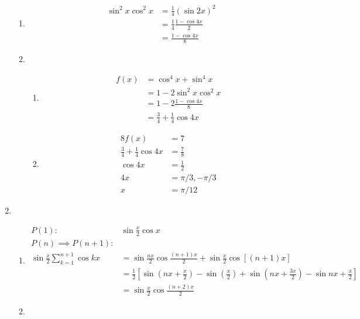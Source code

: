 \documentclass[12pt]{article}
\begin{document}
\begin{enumerate}
\begin{enumerate}
            \item \begin{align*}
                \sin^2{x}\cos^2{x}&=\frac{1}{4}(\sin{2x})^2\\
                &=\frac{1}{4}\frac{1-\cos{4x}}{2}\\
                &=\frac{1-\cos{4x}}{8}
            \end{align*}
            \item \begin{enumerate}
                \item \begin{align*}
                    f(x)&=\cos^4{x}+\sin^4{x}\\
                    &=1-2\sin^2{x}\cos^2{x}\\
                    &=1-2\frac{1-\cos{4x}}{8}\\
                    &=\frac{3}{4}+\frac{1}{4}\cos{4x}
                \end{align*}
                \item \begin{align*}
                    8f(x)&=7\\
                    \frac{3}{4}+\frac{1}{4}\cos{4x}&=\frac{7}{8}\\
                    \cos{4x}&=\frac{1}{2}\\
                    4x&=\pi/3, -\pi/3\\
                    x&=\pi/12
                \end{align*}
            \end{enumerate}
        \end{enumerate}
        \item \begin{enumerate}
            \item \begin{align*}
                P(1):&\sin{\frac{x}{2}}\cos{x}\\
                P(n)\implies P(n+1):&\\
                \sin{\frac{x}{2}}\sum_{k=1}^{n+1}\cos{kx}&=\sin{\frac{nx}{2}}\cos{\frac{(n+1)x}{2}}+\sin{\frac{x}{2}}\cos[(n+1)x]\\
                &=\frac{1}{2}[\sin(nx+\frac{x}{2})-\sin(\frac{x}{2})+\sin(nx+\frac{3x}{2})-\sin{nx+\frac{x}{2}}]\\
                &=\sin{\frac{x}{2}}\cos{\frac{(n+2)x}{2}}
            \end{align*}
            \item \begin{align*}

\end{align*}
\end{enumerate}
\end{enumerate}
\end{document}
